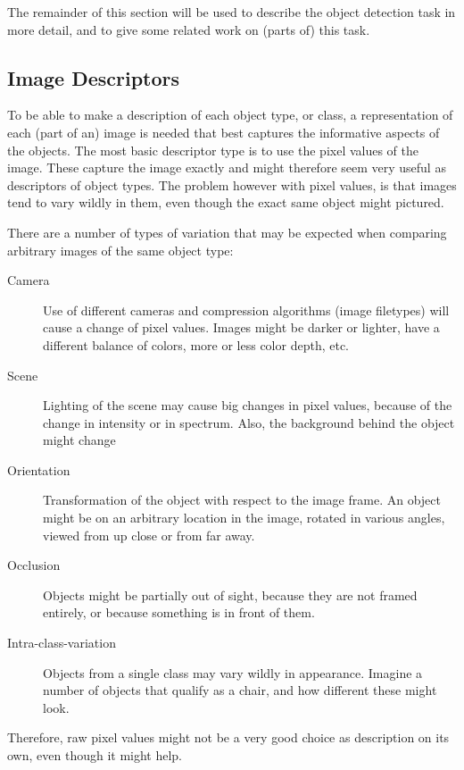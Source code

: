 \documentclass[a4paper,10pt]{article}
\begin{document}
The remainder of this section will be used to describe the object detection task in more detail, and to give some related work on (parts of) this task. 

\subsection{Image Descriptors} %
\label{sub:image_descriptors}
To be able to make a description of each object type, or class, a representation of each (part of an) image is needed that best captures the informative aspects of the objects. The most basic descriptor type is to use the pixel values of the image. These capture the image exactly and might therefore seem very useful as descriptors of object types. The problem however with pixel values, is that images tend to vary wildly in them, even though the exact same object might pictured.

There are a number of types of variation that may be expected when comparing arbitrary images of the same object type:
\begin{description}
    \item[Camera] Use of different cameras and compression algorithms (image filetypes) will cause a change of pixel values. Images might be darker or lighter, have a different balance of colors, more or less color depth, etc.
    \item[Scene] Lighting of the scene may cause big changes in pixel values, because of the change in intensity or in spectrum. Also, the background behind the object might change
    \item[Orientation] Transformation of the object with respect to the image frame. An object might be on an arbitrary location in the image, rotated in various angles, viewed from up close or from far away.
    \item[Occlusion] Objects might be partially out of sight, because they are not framed entirely, or because something is in front of them.
    \item[Intra-class-variation] Objects from a single class may vary wildly in appearance. Imagine a number of objects that qualify as a chair, and how different these might look.
\end{description}
Therefore, raw pixel values might not be a very good choice as description on its own, even though it might help.
\end{document}
